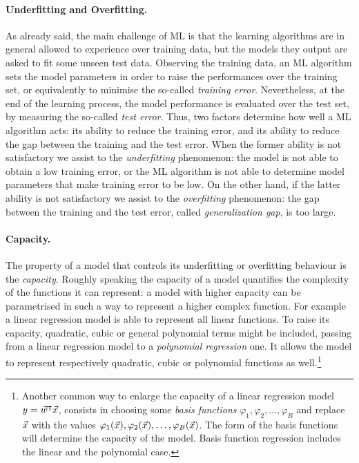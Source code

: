 \paragraph*{Underfitting and Overfitting.} As already said, the main challenge of ML is that the learning algorithms are in general allowed to experience over training data, but the models they output are asked to fit some unseen test data. Observing the training data, an ML algorithm sets the model parameters in order to raise the performances over the training set, or equivalently to minimise the so-called \textit{training error}. Nevertheless, at the end of the learning process, the model performance is evaluated over the test set, by measuring the so-called \textit{test error}. Thus, two factors determine how well a ML algorithm acts: its ability to reduce the training error, and its ability to reduce the gap between the training and the test error. When the former ability is not satisfactory we assist to the \emph{underfitting} phenomenon: the model is not able to obtain a low training error, or the ML algorithm is not able to determine model parameters that make training error to be low. On the other hand, if the latter ability is not satisfactory we assist to the \emph{overfitting} phenomenon: the gap between the training and the test error, called \emph{generalization gap}, is too large. \\

\paragraph*{Capacity.}The property of a model that controls its underfitting or overfitting behaviour is the \emph{capacity}. Roughly speaking the capacity of a model quantifies the complexity of the functions it can represent: a model with higher capacity can be parametrised in such a way to represent a higher complex function. For example a linear regression model is able to represent all linear functions. To raise its capacity, quadratic, cubic or general polynomial terms might be included, passing from a linear regression model to a \emph{polynomial regression} one. It allows the model to represent respectively quadratic, cubic or polynomial functions as well.\footnote{Another common way to enlarge the capacity of a linear regression model $y = \vec{w}^\intercal \vec{x}$,  consists in choosing some \emph{basis functions} $\varphi_1, \varphi_2,\dots, \varphi_B$ and replace $\vec{x}$ with the values $\varphi_1(\vec{x}), \varphi_2(\vec{x}),\dots, \varphi_B(\vec{x})$. The form of the basis functions will determine the capacity of the model. Basis function regression includes the linear and the polynomial case.} \\

